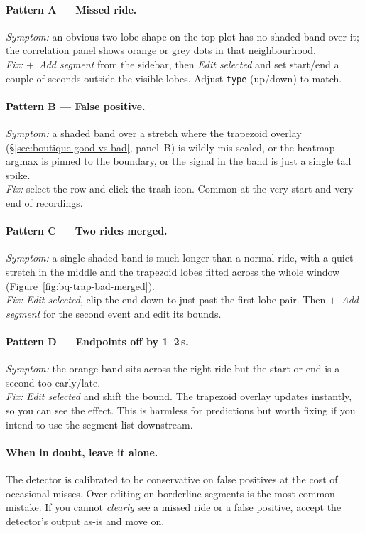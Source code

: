 \paragraph{Pattern A --- Missed ride.}
\textit{Symptom:} an obvious two-lobe shape on the top plot has no
shaded band over it; the correlation panel shows orange or grey
dots in that neighbourhood.\\
\textit{Fix:} \emph{$+$~Add segment} from the sidebar, then
\emph{Edit selected} and set start/end a couple of seconds outside
the visible lobes. Adjust \texttt{type} (up/down) to match.

\paragraph{Pattern B --- False positive.}
\textit{Symptom:} a shaded band over a stretch where the trapezoid
overlay (\S\ref{sec:boutique-good-vs-bad}, panel~B) is wildly
mis-scaled, or the heatmap argmax is pinned to the boundary, or
the signal in the band is just a single tall spike.\\
\textit{Fix:} select the row and click the trash icon.
Common at the very start and very end of recordings.

\paragraph{Pattern C --- Two rides merged.}
\textit{Symptom:} a single shaded band is much longer than a normal
ride, with a quiet stretch in the middle and the trapezoid lobes
fitted across the whole window
(Figure~\ref{fig:bq-trap-bad-merged}).\\
\textit{Fix:} \emph{Edit selected}, clip the end down to just past
the first lobe pair. Then \emph{$+$~Add segment} for the second
event and edit its bounds.

\paragraph{Pattern D --- Endpoints off by 1--2\,s.}
\textit{Symptom:} the orange band sits across the right ride but
the start or end is a second too early/late.\\
\textit{Fix:} \emph{Edit selected} and shift the bound. The
trapezoid overlay updates instantly, so you can see the effect.
This is harmless for predictions but worth fixing if you intend
to use the segment list downstream.

\paragraph{When in doubt, leave it alone.} The detector is
calibrated to be conservative on false positives at the cost of
occasional misses. Over-editing on borderline segments is the
most common mistake. If you cannot \emph{clearly} see a missed
ride or a false positive, accept the detector's output as-is and
move on.

